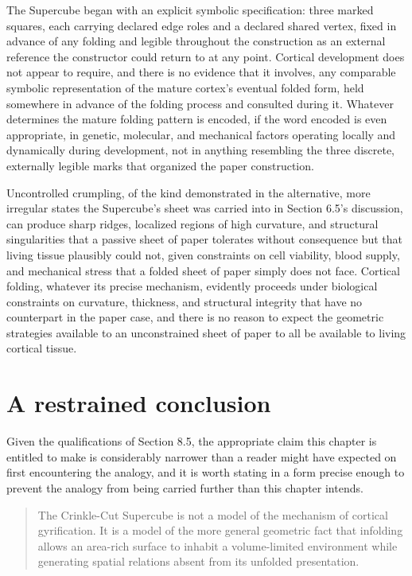 \documentclass[11pt,oneside]{book}
\begin{document}
The Supercube began with an explicit symbolic specification: three
marked squares, each carrying declared edge roles and a declared shared
vertex, fixed in advance of any folding and legible throughout the
construction as an external reference the constructor could return to at
any point. Cortical development does not appear to require, and there is
no evidence that it involves, any comparable symbolic representation of
the mature cortex's eventual folded form, held somewhere in advance of
the folding process and consulted during it. Whatever determines the
mature folding pattern is encoded, if the word encoded is even
appropriate, in genetic, molecular, and mechanical factors operating
locally and dynamically during development, not in anything resembling
the three discrete, externally legible marks that organized the paper
construction.

Uncontrolled crumpling, of the kind demonstrated in the alternative,
more irregular states the Supercube's sheet was carried into in Section
6.5's discussion, can produce sharp ridges, localized regions of high
curvature, and structural singularities that a passive sheet of paper
tolerates without consequence but that living tissue plausibly could
not, given constraints on cell viability, blood supply, and mechanical
stress that a folded sheet of paper simply does not face. Cortical
folding, whatever its precise mechanism, evidently proceeds under
biological constraints on curvature, thickness, and structural integrity
that have no counterpart in the paper case, and there is no reason to
expect the geometric strategies available to an unconstrained sheet of
paper to all be available to living cortical tissue.

\hypertarget{a-restrained-conclusion}{%
\section{A restrained conclusion}\label{a-restrained-conclusion}}

Given the qualifications of Section 8.5, the appropriate claim this
chapter is entitled to make is considerably narrower than a reader might
have expected on first encountering the analogy, and it is worth stating
in a form precise enough to prevent the analogy from being carried
further than this chapter intends.

\begin{quote}
The Crinkle-Cut Supercube is not a model of the mechanism of cortical
gyrification. It is a model of the more general geometric fact that
infolding allows an area-rich surface to inhabit a volume-limited
environment while generating spatial relations absent from its unfolded
presentation.
\end{quote}
\end{document}
